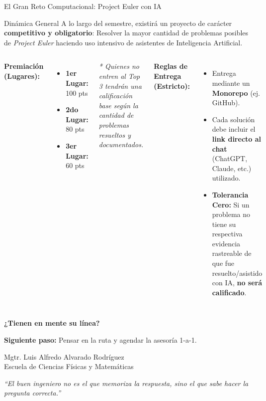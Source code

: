 \documentclass[aspectratio=169]{beamer}
\begin{document}
\begin{frame}{El Gran Reto Computacional: Project Euler con IA}
    \begin{block}{Dinámica General}
        A lo largo del semestre, existirá un proyecto de carácter \textbf{competitivo y obligatorio}: Resolver la mayor cantidad de problemas posibles de \textit{Project Euler} haciendo uso intensivo de asistentes de Inteligencia Artificial.
    \end{block}
    
    \vspace{0.3cm}
    \begin{columns}[t]
        \textbf{Premiación (Lugares):}
        \begin{itemize}
            \item \textbf{\color{orange!80!black}1er Lugar:} 100 pts
            \item \textbf{\color{gray}2do Lugar:} 80 pts
            \item \textbf{\color{brown}3er Lugar:} 60 pts
        \end{itemize}
        \textit{* Quienes no entren al Top 3 tendrán una calificación base según la cantidad de problemas resueltos y documentados.}

        \textbf{Reglas de Entrega (Estricto):}
        \begin{itemize}
            \item Entrega mediante un \textbf{Monorepo} (ej. GitHub).
            \item Cada solución debe incluir el \textbf{link directo al chat} (ChatGPT, Claude, etc.) utilizado.
            \item \textbf{Tolerancia Cero:} Si un problema no tiene su respectiva evidencia rastreable de que fue resuelto/asistido con IA, \textbf{no será calificado}.
        \end{itemize}
    \end{columns}
\end{frame}

\begin{frame}
    \centering
    \Huge \textbf{¿Tienen en mente su línea?}
    
    \vspace{0.8cm}
    \large
    \textbf{Siguiente paso:} Pensar en la ruta y agendar la asesoría 1-a-1.
    
    \vspace{0.5cm}
    \normalsize
    Mgtr. Luis Alfredo Alvarado Rodríguez\\
    \small Escuela de Ciencias Físicas y Matemáticas
    
    \vspace{0.5cm}
    \footnotesize
    \textit{``El buen ingeniero no es el que memoriza la respuesta, sino el que sabe hacer la pregunta correcta.''}
\end{frame}
\end{document}
